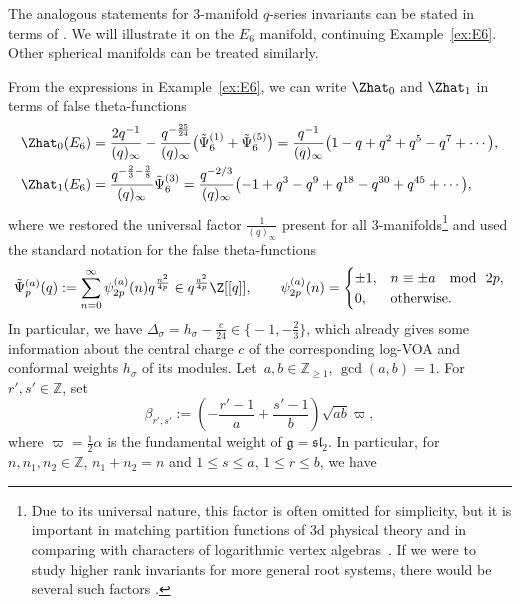 \documentclass[pdftex]{sigma}
\begin{document}
The analogous statements for 3-manifold $q$-series invariants can be stated in terms of . We will illustrate it on the $E_6$ manifold, continuing Example~\ref{ex:E6}. Other spherical manifolds can be treated similarly.
\begin{Example}
	From the expressions in Example~\ref{ex:E6}, we can write $\Zhat_0$ and $\Zhat_1$ in terms of false theta-functions
	\begin{align}
		\Zhat_0 (E_6) & = \frac{2 q^{-1}}{(q)_{\infty}} - \frac{q^{- \frac{25}{24}}}{(q)_{\infty}} \bigl( \tilde \Psi^{(1)}_6 + \tilde \Psi^{(5)}_6 \bigr) = \frac{q^{-1}}{(q)_{\infty}} \bigl(
		1 - q + q^2 + q^5 - q^7
		+ \cdots \bigr),
		\nonumber\\
		\Zhat_1 (E_6) & = \frac{q^{ - \frac{2}{3} - \frac{3}{8}}}{(q)_{\infty}} \tilde \Psi^{(3)}_6 = \frac{q^{-2/3}}{(q)_{\infty}} \bigl(
		-1 + q^3 - q^9 + q^{18} - q^{30} + q^{45}
		+ \cdots \bigr) ,\label{ZhatE6}
	\end{align}
	where we restored the universal factor $\frac{1}{(q)_{\infty}}$ present for all 3-manifolds\footnote{Due to its universal nature, this factor is often omitted for simplicity, but it is important in matching partition functions of 3d physical theory \cite{GPPV20} and in comparing with characters of logarithmic vertex algebras~\cite{CCFGH18, CCFFGHP22, Sug22}. If we were to study higher rank invariants for more general root systems, there would be several such factors \cite{Pa20a}.} and used the standard notation for the false theta-functions
	\begin{gather}
		\tilde \Psi^{(a)}_p (q) : = \sum_{n = 0}^\infty \psi^{(a)}_{2p}(n) q^{\frac{n^2}{4p}} \in q^\frac{a^2}{4p} \Z[[q]],
		\qquad
		\psi^{(a)}_{2p}(n) =
		\begin{cases}
			\pm 1, & n\equiv \pm a~\mod~ 2p , \\
			0, & \text{otherwise}.
		\end{cases} \label{falsetheta}
	\end{gather}
	In particular, we have
$\Delta_\sigma = h_\sigma - \frac{c}{24} \in \bigl\{ -1 , - \tfrac{2}{3} \bigr\}$,
	which already gives some information about the central charge $c$ of the corresponding log-VOA and conformal weights $h_\sigma$ of its modules. Let~${a, b \in \mathbb{Z}_{\geq 1}}$, $\gcd(a, b) = 1$. For $r', s' \in \mathbb{Z}$, set
\[
\beta_{r',s'} := \left( -\frac{r'-1}{a} + \frac{s'-1}{b} \right) \sqrt{ab}\varpi,
\]
where $\varpi = \frac{1}{2}\alpha$ is the fundamental weight of $\mathfrak{g} = \mathfrak{sl}_2$. In particular, for $n, n_1, n_2 \in \mathbb{Z}$, $n_1 + n_2 = n$ and $1 \leq s \leq a$, $1 \leq r \leq b$, we have

\end{Example}
\end{document}
